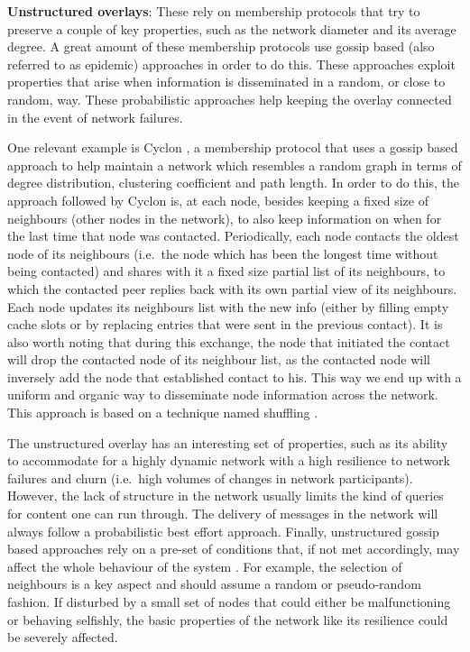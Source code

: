 \textbf{Unstructured overlays}: These rely on membership protocols that
try to preserve a couple of key properties, such as the network diameter
and its average degree. A great amount of these membership protocols use
gossip based (also referred to as epidemic) approaches in order to do
this. These approaches exploit properties that arise when information is
disseminated in a random, or close to random, way. These probabilistic
approaches help keeping the overlay connected in the event of network
failures.

One relevant example is Cyclon \cite{Voulgaris2005a}, a membership
protocol that uses a gossip based approach to help maintain a network
which resembles a random graph in
terms of degree distribution, clustering coefficient and path length. In
order to do this, the approach followed by Cyclon is, at each node,
besides keeping a fixed size of neighbours (other nodes in the network),
to also keep information on when for the last time that node was
contacted. Periodically, each node contacts the oldest node of its
neighbours (i.e.~the node which has been the longest time without being
contacted) and shares with it a fixed size partial list of its
neighbours, to which the contacted peer replies back with its own
partial view of its neighbours. Each node updates its neighbours list
with the new info (either by filling empty cache slots or by replacing
entries that were sent in the previous contact). It is also worth noting
that during this exchange, the node that initiated the contact will drop
the contacted node of its neighbour list, as the contacted node will
inversely add the node that established contact to his. This way we end
up with a uniform and organic way to disseminate node information across
the network. This approach is based on a technique named shuffling \cite{Stavrou2002}.

The unstructured overlay has an interesting set of properties, such as
its ability to accommodate for a highly dynamic network with a high
resilience to network failures and churn (i.e.~high volumes of changes
in network participants). However, the lack of structure in the network
usually limits the kind of queries for content one can run through. The
delivery of messages in the network will always follow a probabilistic
best effort approach. Finally, unstructured gossip based approaches rely
on a pre-set of conditions that, if not met accordingly, may affect the
whole behaviour of the system \cite{Alvisi2007}. For example, the selection of
neighbours is a key aspect and should assume a random or pseudo-random
fashion. If disturbed by a small set of nodes that could either be
malfunctioning or behaving selfishly, the basic properties of the
network like its resilience could be severely affected.
\bigskip

